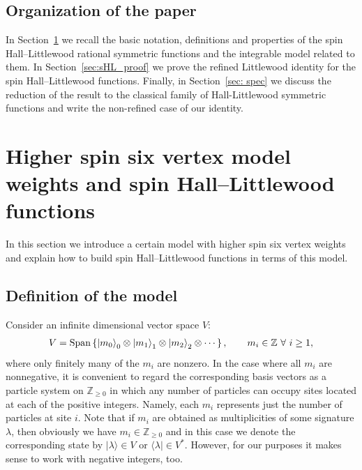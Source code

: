 \documentclass[ALCO,Unicode]{cedram}
\newcommand{\ket}[1]{\left|#1\right\rangle}
\begin{document}
\subsection{Organization of the paper} In Section~\ref{sec:vertex_and_sHL} we recall the basic notation,
definitions and properties of the spin Hall--Littlewood rational symmetric functions and the integrable model related to them.
In Section~\ref{sec:sHL_proof} we prove the refined Littlewood identity 
for the spin Hall--Littlewood functions.
Finally, in Section~\ref{sec: spec}
we discuss the reduction of the result to the classical family of Hall-Littlewood symmetric functions and write the non-refined case of our identity.


\section{Higher spin six vertex model weights and spin Hall--Littlewood functions} \label{sec:vertex_and_sHL}

In this section we introduce a certain model with higher spin six vertex weights and explain how to build spin Hall--Littlewood functions in terms of this model.

\subsection{Definition of the model}
Consider an infinite dimensional vector space $V$:
\begin{align*}
\label{space}
V 
=
{\rm Span} 
\left\{
\ket{m_0}_0
\otimes
\ket{m_1}_1 
\otimes
\ket{m_2}_2 
\otimes
\cdots
\right\},
\qquad
m_i \in \mathbb{Z}\ \forall\ i \geq 1,
\end{align*}
where only finitely many of the $m_i$ are nonzero.
In the case where all  $m_i$ are nonnegative, it is convenient to regard the corresponding basis vectors as a particle system on $\mathbb{Z}_{\geq 0}$ in which any number of particles can occupy sites located at each of the positive integers. Namely, each $m_i$ represents just the number of particles at site $i$.
Note that
if $m_i$ are obtained as multiplicities of some signature $\lambda$, then obviously we have $m_i \in \mathbb{Z}_{\geq 0}$  and in this case we denote the corresponding state by $|\lambda\rangle \in V$ or $\langle \lambda | \in V^*$. However, for our purposes it makes sense to work with negative integers, too.
\end{document}
